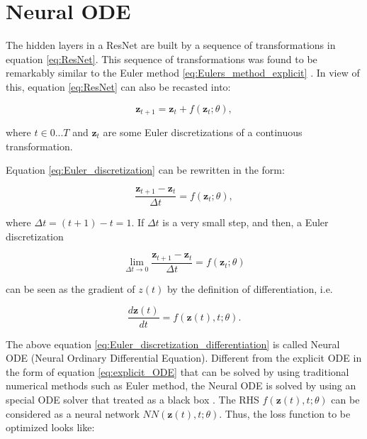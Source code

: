 \documentclass[
	parskip, 			   %
	twoside, 			   %
	DIV=14, 			   %
	BCOR=15.0mm, 		   %
	headsepline, 		   %
	open=right, 		   %
	captions=tableheading, %
	bibliography=totoc,    %
	numbers=noenddot       %
]{scrreprt}
\begin{document}
\section{Neural ODE}
The hidden layers in a ResNet are built by a sequence of transformations in equation \ref{eq:ResNet}. This sequence of transformations was found to be remarkably similar to the Euler method \ref{eq:Eulers_method_explicit} \cite{ruthotto2020deep}. In view of this, equation \ref{eq:ResNet} can also be recasted into:

\begin{equation}
    \label{eq:Euler_discretization}
    \mathbf{z}_{t+1} = \mathbf{z}_{t} + f(\mathbf{z}_{t}; \theta),
\end{equation}

where $t \in {0 ... T}$ and $\mathbf{z}_{t}$ are some Euler discretizations of a continuous transformation.

Equation \ref{eq:Euler_discretization} can be rewritten in the form:

\begin{equation}
    \label{eq:Euler_discretization_rewritten}
    \frac{\mathbf{z}_{t+1}-\mathbf{z}_{t}}{\Delta t} = f(\mathbf{z}_{t}; \theta),
\end{equation}

where $\Delta t = (t+1)-t = 1$. If $\Delta t$ is a very small step, and then, a Euler discretization

\begin{equation}
    \label{eq:Euler_discretization_small_step}
    \lim_{\Delta t \to 0} \frac{\mathbf{z}_{t+1}-\mathbf{z}_{t}}{\Delta t} = f(\mathbf{z}_{t}; \theta)
\end{equation}

can be seen as the gradient of $z(t)$ by the definition of differentiation, i.e.

\begin{equation}
    \label{eq:Euler_discretization_differentiation}
    \frac{d\mathbf{z}(t)}{dt} = f(\mathbf{z}(t), t; \theta).
\end{equation}

The above equation \ref{eq:Euler_discretization_differentiation} is called Neural ODE (Neural Ordinary Differential Equation). Different from the explicit ODE in the form of equation \ref{eq:explicit_ODE} that can be solved by using traditional numerical methods such as Euler method, the Neural ODE is solved by using an special ODE solver that treated as a black box \cite{chen2018neural}. The RHS $f(\mathbf{z}(t), t; \theta)$ can be considered as a neural network $NN(\mathbf{z}(t), t; \theta)$. Thus, the loss function to be optimized looks like:
\end{document}
